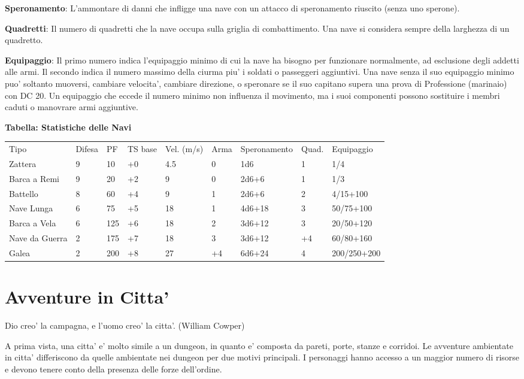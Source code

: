 \documentclass[a4paper,11pt,twoside,openany]{dndbook}
\begin{document}
{\textbf{Speronamento}: L'ammontare di danni che infligge una nave con un attacco di speronamento riuscito (senza uno sperone).

\textbf{Quadretti}: Il numero di quadretti che la nave occupa sulla griglia di combattimento. Una nave si considera sempre della larghezza di un quadretto.

\textbf{Equipaggio}: Il primo numero indica l'equipaggio minimo di cui la nave ha bisogno per funzionare normalmente, ad esclusione degli addetti alle armi. Il secondo indica il numero massimo della ciurma piu' i soldati o passeggeri aggiuntivi. Una nave senza il suo equipaggio minimo puo' soltanto muoversi, cambiare velocita', cambiare direzione, o speronare se il suo capitano supera una prova di Professione (marinaio) con DC 20.
Un equipaggio che eccede il numero minimo non influenza il movimento, ma i suoi componenti possono sostituire i membri caduti o manovrare armi aggiuntive.

\bigskip

\textbf{Tabella: Statistiche delle Navi}

{\small
\begin{tabular}[c]{@{}lllllllll@{}}
\toprule 
Tipo & Difesa & PF & TS base & Vel. (m/s) & Arma & Speronamento & Quad. & Equipaggio\tabularnewline
Zattera & 9 & 10 & +0 & 4.5 & 0 & 1d6 & 1 & 1/4\tabularnewline
Barca a Remi & 9 & 20 & +2 & 9 & 0 & 2d6+6 & 1 & 1/3\tabularnewline
Battello & 8 & 60 & +4 & 9 & 1 & 2d6+6 & 2 & 4/15+100\tabularnewline
Nave Lunga & 6 & 75 & +5 & 18 & 1 & 4d6+18 & 3 & 50/75+100\tabularnewline
Barca a Vela & 6 & 125 & +6 & 18 & 2 & 3d6+12 & 3 & 20/50+120\tabularnewline
Nave da Guerra & 2 & 175 & +7 & 18 & 3 & 3d6+12 & +4 & 60/80+160\tabularnewline
Galea & 2 & 200 & +8 & 27 & +4 & 6d6+24 & 4 & 200/250+200\tabularnewline
\bottomrule
\end{tabular}}

\pagebreak

\section{Avventure in Citta'}

\label{avventure-in-citta}
\begin{quotebox}
Dio creo' la campagna, e l'uomo creo' la citta'. (William Cowper)
\end{quotebox}

A prima vista, una citta' e' molto simile a un dungeon, in quanto e' composta da pareti, porte, stanze e corridoi. Le avventure ambientate in citta' differiscono da quelle ambientate nei dungeon per due motivi principali. I personaggi hanno accesso a un maggior numero di risorse e devono tenere conto della presenza delle forze dell'ordine.

}
\end{document}
